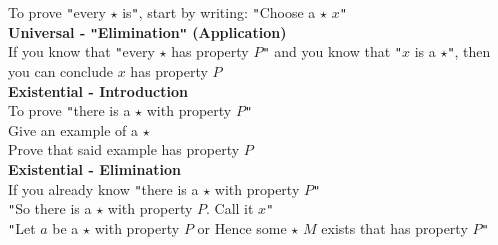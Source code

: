 \documentclass{article}
\begin{document}
			\indent{\hspace{\parindent}\hspace{\parindent}}To prove \verb|"|every $\star$ is\verb|"|, start by writing: \verb|"|Choose a $\star$ $x$\verb|"| \\
		\indent{\hspace{\parindent}}\textbf{Universal - \texttt{"}Elimination\texttt{"} (Application)} \\
			\indent{\hspace{\parindent}\hspace{\parindent}}If you know that \verb|"|every $\star$ has property $P$\verb|"| and you know that \verb|"|$x$ is a $\star$\verb|"|, then you can conclude $x$ has property $P$ \\
		\indent{\hspace{\parindent}}\textbf{Existential - Introduction} \\
			\indent{\hspace{\parindent}\hspace{\parindent}}To prove \verb|"|there is a $\star$ with property $P$\verb|"| \\
				\indent{\hspace{\parindent}\hspace{\parindent}\hspace{\parindent}}Give an example of a $\star$ \\
				\indent{\hspace{\parindent}\hspace{\parindent}\hspace{\parindent}}Prove that said example has property $P$ \\
		\indent{\hspace{\parindent}}\textbf{Existential - Elimination} \\
			\indent{\hspace{\parindent}\hspace{\parindent}}If you already know \verb|"|there is a $\star$ with property $P$\verb|"| \\
				\indent{\hspace{\parindent}\hspace{\parindent}\hspace{\parindent}}\verb|"|So there is a $\star$ with property $P$. Call it $x$\verb|"| \\
				\indent{\hspace{\parindent}\hspace{\parindent}\hspace{\parindent}}\verb|"|Let $a$ be a $\star$ with property $P$ or Hence some $\star$ $M$ exists that has property $P$\verb|"| \\
\end{document}
